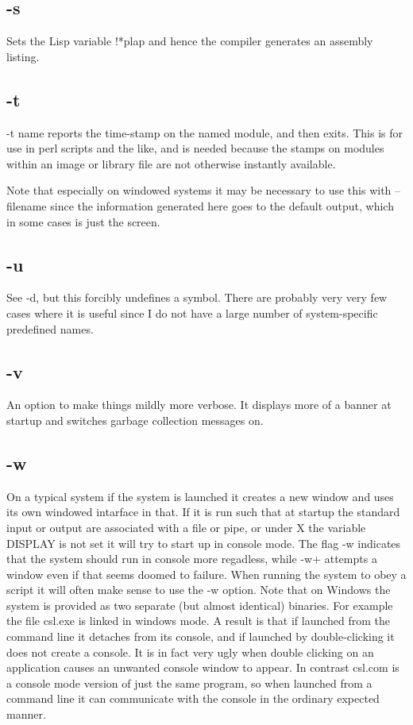 \documentclass[a4paper,11pt]{article}
\begin{document}
\subsection{\ttfamily -s}
   Sets the Lisp variable {\ttfamily !*plap} and hence the compiler generates
   an assembly listing.

\subsection{\ttfamily -t}
   {\ttfamily -t name} reports the time-stamp on the named module, and then
   exits. This is for use in perl scripts and the like, and is
   needed because the stamps on modules within an image or
   library file are not otherwise instantly available.
  
   Note that especially on windowed systems it may be necessary to use this
   with {\ttfamily -- filename} since the information generated here goes to
   the default output, which in some cases is just the screen.

\subsection{\ttfamily -u}
   See {\ttfamily -d}, but this forcibly undefines a symbol. There are probably
   very very few cases where it is useful since I do not have a large
   number of system-specific predefined names.

\subsection{\ttfamily -v}
   An option to make things mildly more verbose. It displays more of a banner
   at startup and switches garbage collection messages on.

\subsection{\ttfamily -w}
   On a typical system if the system is launched it creates a new window and uses
   its own windowed intarface in that. If it is run such that at startup the
   standard input or output are associated with a file or pipe, or under X the
   variable {\ttfamily DISPLAY} is not set it will try to start up in console
   mode. The flag {\ttfamily -w} indicates that the system should run in console
   more regadless, while {\ttfamily -w+} attempts a window even if that seems
   doomed to failure. When running the system to obey a script it will often make
   sense to use the {\ttfamily -w} option. Note that on Windows the system is
   provided as two separate (but almost identical) binaries. For example the
   file {\ttfamily csl.exe} is linked in windows mode. A result is that if
   launched from the command line it detaches from its console, and if launched
   by double-clicking it does not create a console. It is in fact very ugly when
   double clicking on an application causes an unwanted console window to appear.
   In contrast {\ttfamily csl.com} is a console mode version of just the same
   program, so when launched from a command line it can communicate with the
   console in the ordinary expected manner.
\end{document}
